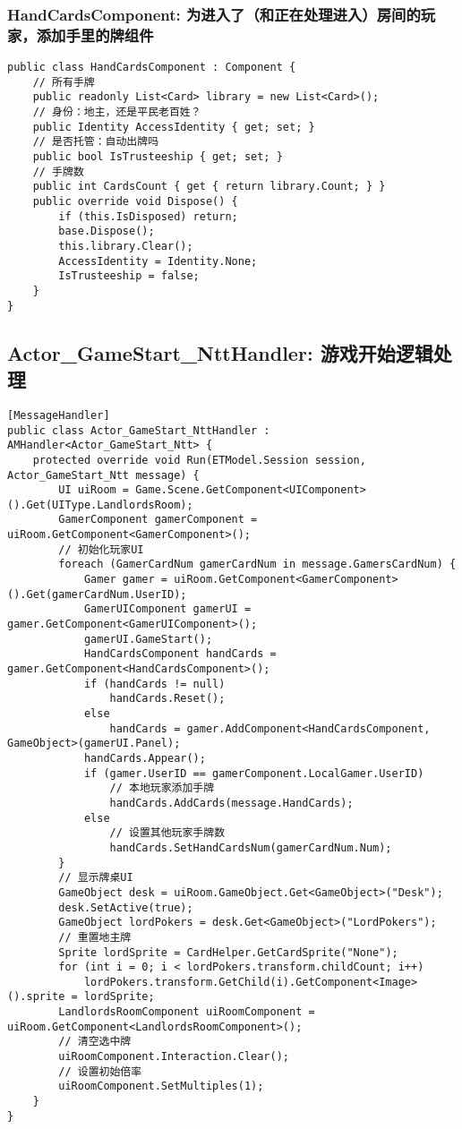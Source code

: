 \documentclass[9pt, b5paper]{article}
\begin{document}
\subsubsection{HandCardsComponent: 为进入了（和正在处理进入）房间的玩家，添加手里的牌组件}
\label{sec-1-6-4}
\begin{verbatim}
public class HandCardsComponent : Component {
    // 所有手牌
    public readonly List<Card> library = new List<Card>();
    // 身份：地主，还是平民老百姓？
    public Identity AccessIdentity { get; set; }
    // 是否托管：自动出牌吗
    public bool IsTrusteeship { get; set; }
    // 手牌数
    public int CardsCount { get { return library.Count; } }
    public override void Dispose() {
        if (this.IsDisposed) return;
        base.Dispose();
        this.library.Clear();
        AccessIdentity = Identity.None;
        IsTrusteeship = false;
    }
}
\end{verbatim}
\subsection{Actor\_GameStart\_NttHandler: 游戏开始逻辑处理}
\label{sec-1-7}
\begin{verbatim}
[MessageHandler]
public class Actor_GameStart_NttHandler : AMHandler<Actor_GameStart_Ntt> {
    protected override void Run(ETModel.Session session, Actor_GameStart_Ntt message) {
        UI uiRoom = Game.Scene.GetComponent<UIComponent>().Get(UIType.LandlordsRoom);
        GamerComponent gamerComponent = uiRoom.GetComponent<GamerComponent>();
        // 初始化玩家UI
        foreach (GamerCardNum gamerCardNum in message.GamersCardNum) {
            Gamer gamer = uiRoom.GetComponent<GamerComponent>().Get(gamerCardNum.UserID);
            GamerUIComponent gamerUI = gamer.GetComponent<GamerUIComponent>();
            gamerUI.GameStart();
            HandCardsComponent handCards = gamer.GetComponent<HandCardsComponent>();
            if (handCards != null) 
                handCards.Reset();
            else 
                handCards = gamer.AddComponent<HandCardsComponent, GameObject>(gamerUI.Panel);
            handCards.Appear();
            if (gamer.UserID == gamerComponent.LocalGamer.UserID) 
                // 本地玩家添加手牌
                handCards.AddCards(message.HandCards);
            else 
                // 设置其他玩家手牌数
                handCards.SetHandCardsNum(gamerCardNum.Num);
        }
        // 显示牌桌UI
        GameObject desk = uiRoom.GameObject.Get<GameObject>("Desk");
        desk.SetActive(true);
        GameObject lordPokers = desk.Get<GameObject>("LordPokers");
        // 重置地主牌
        Sprite lordSprite = CardHelper.GetCardSprite("None");
        for (int i = 0; i < lordPokers.transform.childCount; i++) 
            lordPokers.transform.GetChild(i).GetComponent<Image>().sprite = lordSprite;
        LandlordsRoomComponent uiRoomComponent = uiRoom.GetComponent<LandlordsRoomComponent>();
        // 清空选中牌
        uiRoomComponent.Interaction.Clear();
        // 设置初始倍率
        uiRoomComponent.SetMultiples(1);
    }
}
\end{verbatim}
\end{document}
